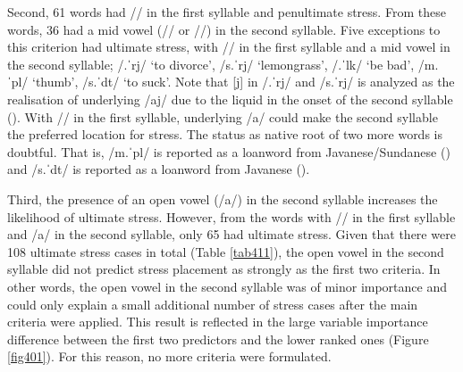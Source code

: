 Second, 61 words had // in the first syllable and penultimate stress. From these words, 36 had a mid vowel (// or //) in the second syllable. Five exceptions to this criterion had ultimate stress, with // in the first syllable and a mid vowel in the second syllable; /.ˈrj/ `to divorce', /s.ˈrj/ `lemongrass', /.ˈlk/ `be bad', /m.ˈpl/ `thumb', /s.ˈdt/ `to suck'. Note that [j] in /.ˈrj/ and /s.ˈrj/ is analyzed as the realisation of underlying /aj/ due to the liquid in the onset of the second syllable (\citealt[84]{kluge_grammar_2017}). With // in the first syllable, underlying /a/ could make the second syllable the preferred location for stress. The status as native root of two more words is doubtful. That is, /m.ˈpl/ is reported as a loanword from Javanese/Sundanese (\citealt{haspelmath_world_2009}) and /s.ˈdt/ is reported as a loanword from Javanese (\citealt{stevens_comprehensive_2010}).\par

Third, the presence of an open vowel (/a/) in the second syllable increases the likelihood of ultimate stress. However, from the words with // in the first syllable and /a/ in the second syllable, only 65 had ultimate stress. Given that there were 108 ultimate stress cases in total (Table \ref{tab411}), the open vowel in the second syllable did not predict stress placement as strongly as the first two criteria. In other words, the open vowel in the second syllable was of minor importance and could only explain a small additional number of stress cases after the main criteria were applied. This result is reflected in the large variable importance difference between the first two predictors and the lower ranked ones (Figure \ref{fig401}). For this reason, no more criteria were formulated.


